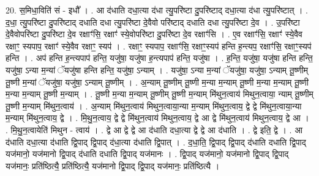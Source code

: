 \documentclass[17pt]{extarticle}
\begin{document}
20. स॒मिधा॒विति॑ सं - इधौ᳚ । . आ द॑धाति दधा॒त्या द॑धा त्यु॒परि॑ष्टा दु॒परि॑ष्टाद् दधा॒त्या द॑धा त्यु॒परि॑ष्टात् । . द॒धा॒ त्यु॒परि॑ष्टा दु॒परि॑ष्टाद् दधाति दधा त्यु॒परि॑ष्टा दे॒वैवो परि॑ष्टाद् दधाति दधा त्यु॒परि॑ष्टा दे॒व । . उ॒परि॑ष्टा दे॒वैवोपरि॑ष्टा दु॒परि॑ष्टा दे॒व रक्षाꣳ॑सि॒ रक्षाꣳ॑ स्ये॒वोपरि॑ष्टा दु॒परि॑ष्टा दे॒व रक्षाꣳ॑सि । . ए॒व रक्षाꣳ॑सि॒ रक्षाꣳ॑ स्ये॒वैव रक्षाꣳ॒॒ स्यपाप॒ रक्षाꣳ॑ स्ये॒वैव रक्षाꣳ॒॒ स्यप॑ । . रक्षाꣳ॒॒ स्यपाप॒ रक्षाꣳ॑सि॒ रक्षाꣳ॒॒स्यप॑ हन्ति ह॒न्त्यप॒ रक्षाꣳ॑सि॒ रक्षाꣳ॒॒स्यप॑ हन्ति । . अप॑ हन्ति ह॒न्त्यपाप॑ हन्ति॒ यजु॑षा॒ यजु॑षा ह॒न्त्यपाप॑ हन्ति॒ यजु॑षा । . ह॒न्ति॒ यजु॑षा॒ यजु॑षा हन्ति हन्ति॒ यजु॑षा॒ ऽन्या म॒न्यां ॅयजु॑षा हन्ति हन्ति॒ यजु॑षा॒ ऽन्याम् । . यजु॑षा॒ ऽन्या म॒न्यां ॅयजु॑षा॒ यजु॑षा॒ ऽन्याम् तू॒ष्णीम् तू॒ष्णी म॒न्यां ॅयजु॑षा॒ यजु॑षा॒ ऽन्याम् तू॒ष्णीम् । . अ॒न्याम् तू॒ष्णीम् तू॒ष्णी म॒न्या म॒न्याम् तू॒ष्णी म॒न्या म॒न्याम् तू॒ष्णी म॒न्या म॒न्याम् तू॒ष्णी म॒न्याम् । . तू॒ष्णी म॒न्या म॒न्याम् तू॒ष्णीम् तू॒ष्णी म॒न्याम् मि॑थुन॒त्वाय॑ मिथुन॒त्वाया॒ न्याम् तू॒ष्णीम् तू॒ष्णी म॒न्याम् मि॑थुन॒त्वाय॑ । . अ॒न्याम् मि॑थुन॒त्वाय॑ मिथुन॒त्वाया॒न्या म॒न्याम् मि॑थुन॒त्वाय॒ द्वे द्वे मि॑थुन॒त्वाया॒न्या म॒न्याम् मि॑थुन॒त्वाय॒ द्वे । . मि॒थु॒न॒त्वाय॒ द्वे द्वे मि॑थुन॒त्वाय॑ मिथुन॒त्वाय॒ द्वे आ द्वे मि॑थुन॒त्वाय॑ मिथुन॒त्वाय॒ द्वे आ । . मि॒थु॒न॒त्वायेति॑ मिथुन - त्वाय॑ । . द्वे आ द्वे द्वे आ द॑धाति दधा॒त्या द्वे द्वे आ द॑धाति । . द्वे इति॒ द्वे । . आ द॑धाति दधा॒त्या द॑धाति द्वि॒पाद् द्वि॒पाद् द॑धा॒त्या द॑धाति द्वि॒पात् । . द॒धा॒ति॒ द्वि॒पाद् द्वि॒पाद् द॑धाति दधाति द्वि॒पाद् यज॑मानो॒ यज॑मानो द्वि॒पाद् द॑धाति दधाति द्वि॒पाद् यज॑मानः । . द्वि॒पाद् यज॑मानो॒ यज॑मानो द्वि॒पाद् द्वि॒पाद् यज॑मानः॒ प्रति॑ष्ठित्यै॒ प्रति॑ष्ठित्यै॒ यज॑मानो द्वि॒पाद् द्वि॒पाद् यज॑मानः॒ प्रति॑ष्ठित्यै । \newline
\end{document}
